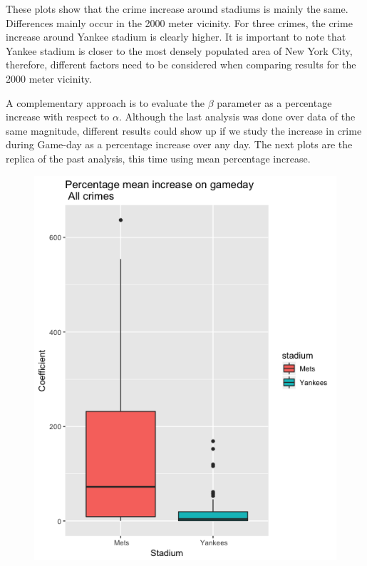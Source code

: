 \documentclass{article}
\begin{document}
These plots show that the crime increase around stadiums is mainly the same. Differences mainly occur in the 2000 meter vicinity. For three crimes, the crime increase around Yankee stadium  is clearly higher.  It is important to note that Yankee stadium is closer to the most densely populated area of New York City, therefore, different factors need to be considered when comparing results for the 2000 meter vicinity. 

A complementary approach is to evaluate the $\beta$ parameter as a percentage increase with respect to $\alpha$. Although the last analysis was done over data of the same magnitude, different results could show up if we study the increase in crime during Game-day as a percentage increase over any day. The next plots are the replica of the past analysis, this time using mean percentage increase.

\begin{figure}[H]
\centering
\includegraphics[scale=0.45]{percent_box_1.png}
\end{figure}
\end{document}
